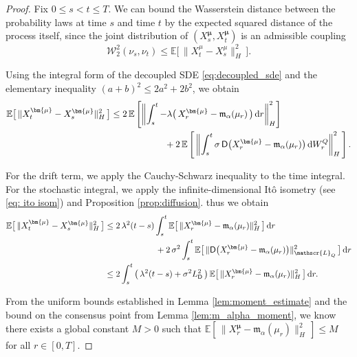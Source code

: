 \documentclass[12pt]{amsart}
\newcommand{\D}[1]{\mbox{\rm #1}}
\newcommand{\dd}{\D{d}}
\numberwithin{equation}{section}
\begin{document}
\begin{proof}
Fix $0 \leq s < t \leq T$. We can bound the Wasserstein distance between the probability laws at time $s$ and time $t$ by the expected squared distance of the process itself, since the joint distribution of $(X^{\bm{\mu}}_s, X^{\bm{\mu}}_t)$ is an admissible coupling
\begin{equation*}
    \mathcal{W}_2^2(\nu_s, \nu_t) \leq \mathbb{E}\big[\,\|X^\mu_t - X^\mu_s\|_H^2\,\big].
\end{equation*}

Using the integral form of the decoupled SDE \eqref{eq:decoupled_sde} and the elementary inequality $(a+b)^2 \leq 2a^2 + 2b^2$, we obtain 
\begin{align*}
    \mathbb{E}\big[\,\|X^{\bm{\mu}}_t - X^{\bm{\mu}}_s\|_H^2\,\big] &\leq 2\, \mathbb{E}\left[ \left\| \int_s^t -\lambda\big(\,X^{\bm{\mu}}_r - \mathfrak{m}_\alpha(\mu_r)\,\big)\, \dd r \right\|_H^2 \right] \nonumber \\
    &\qquad \qquad \qquad + 2\, \mathbb{E}\left[ \,\left\| \int_s^t \sigma \,\mathsf{D}\big(X^{\bm{\mu}}_r - \mathfrak{m}_\alpha(\mu_r)\big)\, \dd W_r^{Q} \right\|_H^2\, \right].
\end{align*}

For the drift term, we apply the Cauchy-Schwarz inequality to the time integral. For the stochastic integral, we apply the infinite-dimensional It\^o isometry (see \eqref{eq: ito isom}) and Proposition \ref{prop:diffusion}. thus we obtain
\begin{align*}
    \mathbb{E}\big[\,\|X^{\bm{\mu}}_t - X^{\bm{\mu}}_s\|_H^2\,\big] &\leq 2\,\lambda^2 (t-s) \int_s^t \mathbb{E}\big[\,\|X^{\bm{\mu}}_r - \mathfrak{m}_\alpha(\mu_r)\|_H^2\,\big] \,\dd r  \\
    &\qquad \qquad \qquad + 2\,\sigma^2 \int_s^t \mathbb{E}\big[\,\|\mathsf{D}\big(X^{\bm{\mu}}_r - \mathfrak{m}_\alpha(\mu_r)\big)\|_{\mathscr{L}_Q}^2\,\big]\, \dd r  \\
    &\leq 2\int_s^t \big( \,\lambda^2(t-s) + \sigma^2 L_{\mathsf{D}}^2 \,\big)\, \mathbb{E}\big[\,\|X^{\bm{\mu}}_r - \mathfrak{m}_\alpha(\mu_r)\|_H^2\,\big] \, \dd r.
\end{align*}

From the uniform bounds established in Lemma \ref{lem:moment_estimate} and the bound on the consensus point from Lemma \ref{lem:m_alpha_moment}, we know there exists a global constant $M > 0$ such that $\mathbb{E}[\,\|X^{\bm{\mu}}_r - \mathfrak{m}_\alpha(\mu_r)\|_H^2\,] \leq M$ for all $r \in [0,T]$. 


\end{proof}
\end{document}
